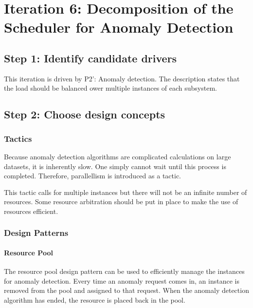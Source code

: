 \section{Iteration 6: Decomposition of the Scheduler for Anomaly Detection}
\label{add:it6}

\subsection{Step 1: Identify candidate drivers}
\label{add:it6/drivers}

\npar This iteration is driven by P2': Anomaly detection. The description states
that the load should be balanced ower multiple instances of each subsystem.

\subsection{Step 2: Choose design concepts}
\label{add:it6/concepts}

\subsubsection{Tactics}
\label{add:it6/tactics}

\npar Because anomaly detection algorithms are complicated calculations on large
datasets, it is inherently slow. One simply cannot wait until this process is
completed. Therefore, parallellism is introduced as a tactic. 

\npar This tactic calls for multiple instances but there will not be an infinite
number of resources. Some resource arbitration should be put in place to make
the use of resources efficient. 

\subsubsection{Design Patterns}
\label{add:it6/patterns}

\paragraph{Resource Pool}

\npar The resource pool design pattern \citep[see][p.~503]{Buschmann:07} can be
used to efficiently manage the instances for anomaly detection. Every time an
anomaly request comes in, an instance is removed from the pool and assigned to
that request. When the anomaly detection algorithm has ended, the resource is
placed back in the pool. 

